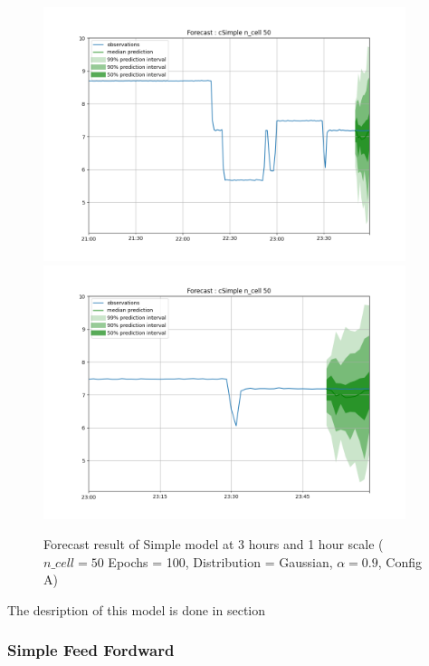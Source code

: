 \documentclass[a4paper, 12pt]{article}
\begin{document}
\begin{figure}[!h]
    \centering
    \includegraphics[width=400px]{plots/forecast/a/cSimple/n_cell/50/180.png}
    \includegraphics[width=400px]{plots/forecast/a/cSimple/n_cell/50/60.png}
    \caption{Forecast result of Simple model at 3 hours and 1 hour scale ($n\_cell = 50$ Epochs = 100, Distribution = Gaussian, $\alpha = 0.9$, Config A)}
    \label{fig:simple}
\end{figure}

The desription of this model is done in section 

\subsubsection{Simple Feed Fordward} \label{comp_feedfordward}
\end{document}
